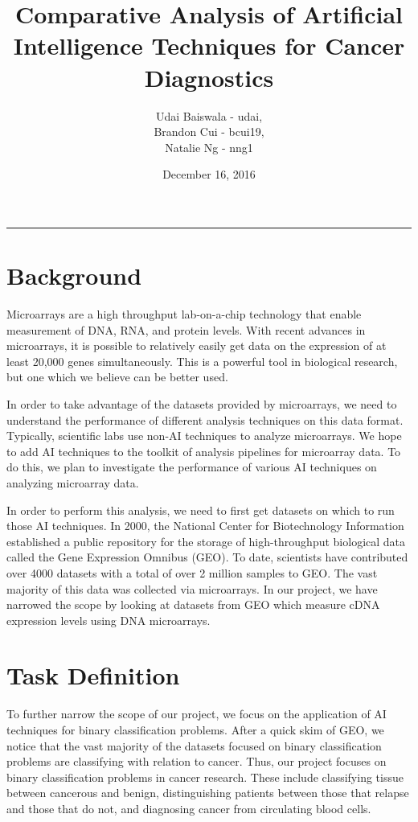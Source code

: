 \documentclass[12pt]{scrartcl}
\title{Comparative Analysis of Artificial Intelligence Techniques for Cancer Diagnostics}
\author{Udai Baiswala - udai, \\ 
Brandon Cui - bcui19, \\ 
Natalie Ng - nng1}
\date{December 16, 2016}
\begin{document}
  \maketitle

  \vspace{-0.3in}
  \rule{\linewidth}{0.4pt}
  
    \section{Background}
    Microarrays are a high throughput lab-on-a-chip technology that enable measurement of DNA, RNA, and protein levels. With recent advances in microarrays, it is possible to relatively easily get data on the expression of at least 20,000 genes simultaneously. This is a powerful tool in biological research, but one which we believe can be better used. 
    
    In order to take advantage of the datasets provided by microarrays, we need to understand the performance of different analysis techniques on this data format. Typically, scientific labs use non-AI techniques to analyze microarrays. We hope to add AI techniques to the toolkit of analysis pipelines for microarray data. To do this, we plan to investigate the performance of various AI techniques on analyzing microarray data. 
    
    In order to perform this analysis, we need to first get datasets on which to run those AI techniques. In 2000, the National Center for Biotechnology Information established a public repository for the storage of high-throughput biological data called the Gene Expression Omnibus (GEO). To date, scientists have contributed over 4000 datasets with a total of over 2 million samples to GEO. The vast majority of this data was collected via microarrays. In our project, we have narrowed the scope by looking at datasets from GEO which measure cDNA expression levels using DNA microarrays. 

    \section{Task Definition}    
    To further narrow the scope of our project, we focus on the application of AI techniques for binary classification problems. After a quick skim of GEO, we notice that the vast majority of the datasets focused on binary classification problems are classifying with relation to cancer. Thus, our project focuses on binary classification problems in cancer research. These include classifying tissue between cancerous and benign, distinguishing patients between those that relapse and those that do not, and diagnosing cancer from circulating blood cells. 
\end{document}
